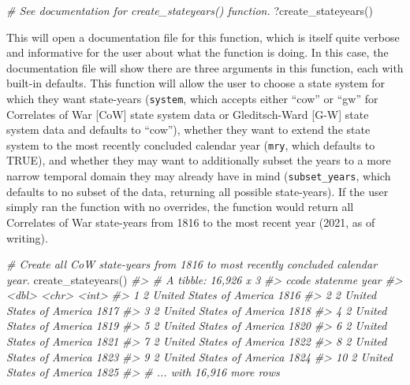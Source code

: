 \documentclass[
  11pt,
]{article}
\newenvironment{Shaded}{\begin{snugshade}}{\end{snugshade}}
\newcommand{\CommentTok}[1]{\textcolor[rgb]{0.56,0.35,0.01}{\textit{#1}}}
\newcommand{\FunctionTok}[1]{\textcolor[rgb]{0.00,0.00,0.00}{#1}}
\newcommand{\NormalTok}[1]{#1}
\begin{document}
\begin{Shaded}
\begin{Highlighting}[]
\CommentTok{\# See documentation for create\_stateyears() function.}
\NormalTok{?}\FunctionTok{create\_stateyears}\NormalTok{()}
\end{Highlighting}
\end{Shaded}

This will open a documentation file for this function, which is itself quite verbose and informative for the user about what the function is doing. In this case, the documentation file will show there are three arguments in this function, each with built-in defaults. This function will allow the user to choose a state system for which they want state-years (\texttt{system}, which accepts either ``cow'' or ``gw'' for Correlates of War {[}CoW{]} state system data or Gleditsch-Ward {[}G-W{]} state system data and defaults to ``cow''), whether they want to extend the state system to the most recently concluded calendar year (\texttt{mry}, which defaults to TRUE), and whether they may want to additionally subset the years to a more narrow temporal domain they may already have in mind (\texttt{subset\_years}, which defaults to no subset of the data, returning all possible state-years). If the user simply ran the function with no overrides, the function would return all Correlates of War state-years from 1816 to the most recent year (2021, as of writing).

\begin{Shaded}
\begin{Highlighting}[]
\CommentTok{\# Create all CoW state{-}years from 1816 to most recently concluded calendar year.}
\FunctionTok{create\_stateyears}\NormalTok{()}
\CommentTok{\#\textgreater{} \# A tibble: 16,926 x 3}
\CommentTok{\#\textgreater{}    ccode statenme                  year}
\CommentTok{\#\textgreater{}    \textless{}dbl\textgreater{} \textless{}chr\textgreater{}                    \textless{}int\textgreater{}}
\CommentTok{\#\textgreater{}  1     2 United States of America  1816}
\CommentTok{\#\textgreater{}  2     2 United States of America  1817}
\CommentTok{\#\textgreater{}  3     2 United States of America  1818}
\CommentTok{\#\textgreater{}  4     2 United States of America  1819}
\CommentTok{\#\textgreater{}  5     2 United States of America  1820}
\CommentTok{\#\textgreater{}  6     2 United States of America  1821}
\CommentTok{\#\textgreater{}  7     2 United States of America  1822}
\CommentTok{\#\textgreater{}  8     2 United States of America  1823}
\CommentTok{\#\textgreater{}  9     2 United States of America  1824}
\CommentTok{\#\textgreater{} 10     2 United States of America  1825}
\CommentTok{\#\textgreater{} \# ... with 16,916 more rows}
\end{Highlighting}
\end{Shaded}
\end{document}
